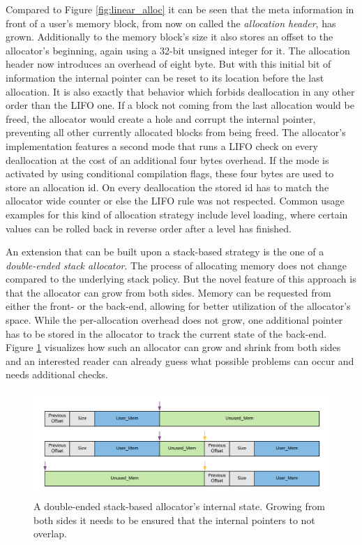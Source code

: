 \noindent
Compared to Figure \ref{fig:linear_alloc} it can be seen that the meta information in front of a user's memory block, from now on called the \textit{allocation header}, has grown. Additionally to the memory block's size it also stores an offset to the allocator's beginning, again using a 32-bit unsigned integer for it. The allocation header now introduces an overhead of eight byte. But with this initial bit of information the internal pointer can be reset to its location before the last allocation. It is also exactly that behavior which forbids deallocation in any other order than the \ac{LIFO} one. If a block not coming from the last allocation would be freed, the allocator would create a hole and corrupt the internal pointer, preventing all other currently allocated blocks from being freed. The allocator's implementation features a second mode that runs a \ac{LIFO} check on every deallocation at the cost of an additional four bytes overhead. If the mode is activated by using conditional compilation flags, these four bytes are used to store an allocation id. On every deallocation the stored id has to match the allocator wide counter or else the \ac{LIFO} rule was not respected. Common usage examples for this kind of allocation strategy include level loading, where certain values can be rolled back in reverse order after a level has finished.

An extension that can be built upon a stack-based strategy is the one of a \textit{double-ended stack allocator}. The process of allocating memory does not change compared to the underlying stack policy. But the novel feature of this approach is that the allocator can grow from both sides. Memory can be requested from either the front- or the back-end, allowing for better utilization of the allocator's space. While the per-allocation overhead does not grow, one additional pointer has to be stored in the allocator to track the current state of the back-end. Figure \ref{fig:double_stack_alloc} visualizes how such an allocator can grow and shrink from both sides and an interested reader can already guess what possible problems can occur and needs additional checks. 

\begin{figure}[h!]
	\centering \includegraphics[width=\linewidth]{PICs/double_stack_alloc.png}
	\caption{A double-ended stack-based allocator's internal state. Growing from both sides it needs to be ensured that the internal pointers to not overlap.}
	\label{fig:double_stack_alloc}
\end{figure}

